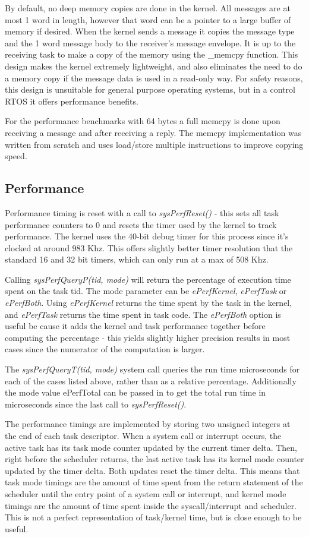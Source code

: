 \documentclass[twoside,a4paper]{refart}
\begin{document}
By default, no deep memory copies are done in the kernel. All messages are at most 1 word in length, however that word can be a pointer to a large buffer of memory if desired. When the kernel sends a message it copies the message type and the 1 word message body to the receiver’s message envelope. It is up to the receiving task to make a copy of the memory using the \_memcpy function. This design makes the kernel extremely lightweight, and also eliminates the need to do a memory copy if the message data is used in a read-only way. For safety reasons, this design is unsuitable for general purpose operating systems, but in a control RTOS it offers performance benefits.

For the performance benchmarks with 64 bytes a full memcpy is done upon receiving a message and after receiving a reply. The memcpy implementation was written from scratch and uses load/store multiple instructions to improve copying speed.

\subsection{Performance}
Performance timing is reset with a call to \textit{sysPerfReset()} - this sets all task performance counters to 0 and resets the timer used by the kernel to track performance. The kernel uses the 40-bit debug timer for this process since it’s clocked at around 983 Khz. This offers slightly better timer resolution that the standard 16 and 32 bit timers, which can only run at a max of 508 Khz.

Calling \textit{sysPerfQueryP(tid, mode)} will return the percentage of execution time spent on the task tid. The mode parameter can be \textit{ePerfKernel}, \textit{ePerfTask} or \textit{ePerfBoth}. Using \textit{ePerfKernel} returns the time spent by the task in the kernel, and \textit{ePerfTask} returns the time spent in task code. The \textit{ePerfBoth} option is useful be cause it adds the kernel and task performance together before computing the percentage - this yields slightly higher precision results in most cases since the numerator of the computation is larger.

The \textit{sysPerfQueryT(tid, mode)} system call queries the run time microseconds for each of the cases listed above, rather than as a relative percentage. Additionally the mode value ePerfTotal can be passed in to get the total run time in microseconds since the last call to \textit{sysPerfReset()}.

The performance timings are implemented by storing two unsigned integers at the end of each task descriptor. When a system call or interrupt occurs, the active task has its task mode counter updated by the current timer delta. Then, right before the scheduler returns, the last active task has its kernel mode counter updated by the timer delta. Both updates reset the timer delta. This means that task mode timings are the amount of time spent from the return statement of the scheduler until the entry point of a system call or interrupt, and kernel mode timings are the amount of time spent inside the syscall/interrupt and scheduler. This is not a perfect representation of task/kernel time, but is close enough to be useful. 
\end{document}
